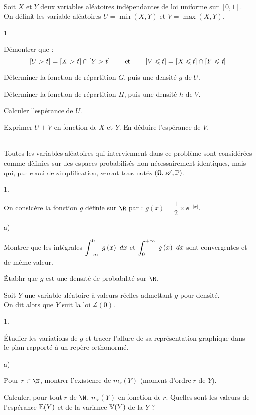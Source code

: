 \documentclass[11pt]{article}%
\begin{document}
\begin{exercice}~\\
  Soit $X$ et $Y$ deux variables aléatoires indépendantes de loi
  uniforme sur $[0 ,1]$.\\
  On définit les variable aléatoires $U = \min (X, Y)$ et $V = \max
  (X, Y)$.
  \begin{noliste}{1.}
  \item Démontrer que :
    \[
    \left[ {U > t} \right] = \left[ {X > t} \right] \cap \left[ {Y > t} \right] \qquad \mbox{et} \qquad 
    \left[ {V \leqslant t} \right] = \left[ {X \leqslant t} \right] \cap \left[ {Y \leqslant t} \right]
    \]
  \item Déterminer la fonction de répartition $G$, puis une densité
    $g$ de $U$.
  \item Déterminer la fonction de répartition $H$, puis une densité
    $h$ de $V$.
  \item Calculer l'espérance de $U$.
  \item Exprimer $U + V$ en fonction de $X$ et $Y$.
    En déduire l'espérance de $V$.
  \end{noliste}
\end{exercice}


\begin{exercice}~\\
  Toutes les variables aléatoires qui interviennent dans ce problème
  sont considérées comme définies sur des espaces probabilisés non
  nécessairement identiques, mais qui, par souci de simplification,
  seront tous notés $\left( \Omega , \mathscr{A}, \mathbb{P}\right)$.
  \begin{noliste}{1.}
  \item On considère la fonction $g$ définie sur $\R$ par : $g(x) =
    \dfrac{1}{2} \times \ee^{-\left\vert x\right\vert }$.
    \begin{noliste}{a)}
    \item Montrer que les intégrales $ \displaystyle \int_{-\infty }^{0}\ g\left(
        x\right) \ dx$ et $ \displaystyle \int_{0}^{+\infty }\ g\left( x\right) \ dx$ 
	sont convergentes et de même valeur.
    \item Établir que $g$ est une densité de probabilité sur $%
      \R$.
    \end{noliste}
  \end{noliste}
  Soit $Y$ une variable aléatoire à valeurs réelles admettant $g$ pour
  densité.\\
  On dit alors que $Y$ suit la loi $\mathcal{L} \left( 0\right)$.
  \begin{noliste}{1.}
    \addtocounter{enumi}{+1}
  \item Étudier les variations de $g$ et tracer l'allure de sa
    représentation graphique dans le plan rapporté à un repère
    orthonormé.
  \item
    \begin{noliste}{a)}
    \item Pour $r \in \N$, montrer l'existence de $m_{r}(Y)$ (moment
      d'ordre $r$ de $Y$).
    \item Calculer, pour tout $r$ de $\N$, $m_{r}(Y)$ en fonction de
      $r$. Quelles sont les valeurs de l'espérance $\mathbb{E}(Y)$ et de la
      variance $\mathbb{V}(Y)$ de la \var $Y$ ?
    \end{noliste}
  \end{noliste}
\end{exercice}
\end{document}
